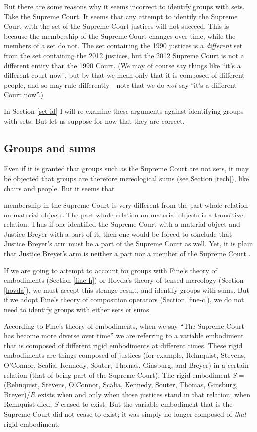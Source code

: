 \documentclass[12pt,twoside]{reedfancy}
\newenvironment{squote}{%
	\begin{spacing}{1}
	\begin{list}{}{%
	\setlength{\labelwidth}{0pt}%
	\rightmargin\leftmargin%
	}
	\item\relax
	}{%
	\end{list}%
	\end{spacing}
	}
\begin{document}
\begin{spacing}{1.25}
But there are some reasons why it seems incorrect to identify groups
with sets.  Take the Supreme Court.  It seems that any attempt to
identify the Supreme Court with the set of the Supreme Court justices
will not succeed.  This is because the membership of the Supreme Court
changes over time, while the members of a set do not.  The set
containing the 1990 justices is a {\em different} set from the set
containing the 2012 justices, but the 2012 Supreme Court is not a
different entity than the 1990 Court.  (We may of course say things
like ``it's a different court now'', but by that we mean only that it
is composed of different people, and so may rule differently---note
that we do {\em not} say ``it's a different Court now''.)

In Section \ref{set-id} I will re-examine these arguments against
identifying groups with sets.  But let us suppose for now that they
are correct.

\subsection{Groups and sums}
\label{group-sum}
Even if it is granted that groups such as the Supreme Court are not
sets, it may be objected that groups are therefore mereological sums
(see Section \ref{tech}), like chairs and people.  But it seems that

\begin{squote}
membership in the Supreme Court is very different from
the part-whole relation on material objects.  The part-whole relation
on material objects is a transitive relation.  Thus if one identified
the Supreme Court with a material object and Justice Breyer with a
part of it, then one would be forced to conclude that Justice Breyer's
arm must be a part of the Supreme Court as well.  Yet, it is plain
that Justice Breyer's arm is neither a part nor a member of the
Supreme Court \citep[136--137]{uzquiano2004a}.
\end{squote}

If we are going to attempt to account for groups with Fine's theory of
embodiments (Section \ref{fine-h}) or Hovda's theory of tensed
mereology (Section \ref{hovda}), we must accept this strange result,
and identify groups with sums.  But if we adopt Fine's theory of
composition operators (Section \ref{fine-c}), we do not need to
identify groups with either sets or sums.

According to Fine's theory of embodiments, when we say ``The Supreme
Court has become more diverse over time'' we are referring to a
variable embodiment that is composed of different rigid embodiments at
different times.  These rigid embodiments are things composed of
justices (for example, Rehnquist, Stevens, O'Connor, Scalia, Kennedy,
Souter, Thomas, Ginsburg, and Breyer) in a certain relation (that of
being part of the Supreme Court).  The rigid embodiment $S =$
(Rehnquist, Stevens, O'Connor, Scalia, Kennedy, Souter, Thomas,
Ginsburg, Breyer)/$R$ exists when and only when those justices stand
in that relation; when Rehnquist died, $S$ ceased to exist.  But the
variable embodiment that is the Supreme Court did not cease to exist;
it was simply no longer composed of {\em that} rigid embodiment.


\end{spacing}
\end{document}
